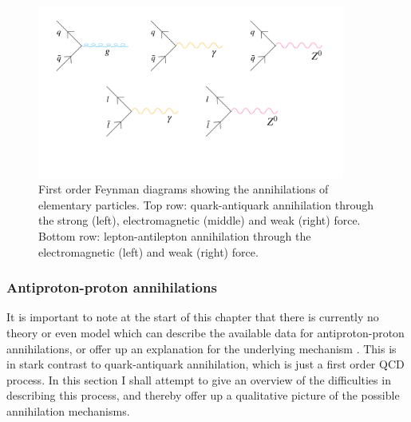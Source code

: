 \begin{figure}
    \centering
    \includegraphics[width=0.9\textwidth]{figures/Annihilation_Feynman_diagram.pdf}
    \caption{First order Feynman diagrams showing the annihilations of elementary particles. Top row: quark-antiquark annihilation through the strong (left), electromagnetic (middle) and weak (right) force. Bottom row: lepton-antilepton annihilation through the electromagnetic (left) and weak (right) force.}
    \label{fig:annihilationsFeynmanElementary}
\end{figure}

\subsubsection{Antiproton-proton annihilations}
It is important to note at the start of this chapter that there is currently no theory or even model which can describe the available data for antiproton-proton annihilations, or offer up an explanation for the underlying mechanism \cite{antiproton_cross_sections_review}. This is in stark contrast to quark-antiquark annihilation, which is just a first order QCD process. In this section I shall attempt to give an overview of the difficulties in describing this process, and thereby offer up a qualitative picture of the possible annihilation mechanisms.\\

